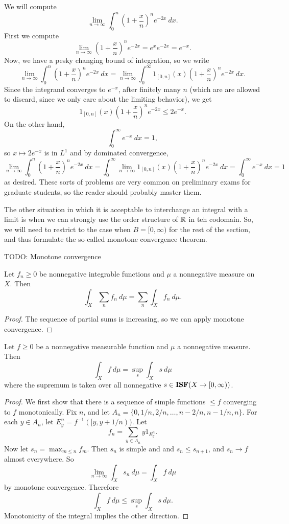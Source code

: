 \begin{example}
We will compute
$$\lim_{n \to \infty} \int_0^n \left(1 + \frac{x}{n}\right)^n e^{-2x} ~dx.$$
First we compute
$$\lim_{n \to \infty} \left(1 + \frac{x}{n}\right)^n e^{-2x} = e^x e^{-2x} = e^{-x}.$$
Now, we have a pesky changing bound of integration, so we write
$$\lim_{n \to \infty} \int_0^n \left(1 + \frac{x}{n}\right)^n e^{-2x} ~dx = \lim_{n \to \infty} \int_0^\infty 1_{[0, n]}(x) \left(1 + \frac{x}{n}\right)^n e^{-2x} ~dx.$$
Since the integrand converges to $e^{-x}$, after finitely many $n$ (which are are allowed to discard, since we only care about the limiting behavior), we get
$$1_{[0, n]}(x) \left(1 + \frac{x}{n}\right)^n e^{-2x} \leq 2e^{-x}.$$
On the other hand,
$$\int_0^\infty e^{-x} ~dx = 1,$$
so $x \mapsto 2e^{-x}$ is in $L^1$ and by dominated convergence,
$$\lim_{n \to \infty} \int_0^n \left(1 + \frac{x}{n}\right)^n e^{-2x} ~dx = \int_0^\infty \lim_{n \to \infty} 1_{[0, n]}(x) \left(1 + \frac{x}{n}\right)^n e^{-2x} ~dx = \int_0^\infty e^{-x} ~dx = 1$$
as desired.
These sorts of problems are very common on preliminary exams for graduate students, so the reader should probably master them.
\end{example}

\begin{subsec}
The other situation in which it is acceptable to interchange an integral with a limit is when we can strongly use the order structure of $\mathbb{R}$ in teh codomain.
So, we will need to restrict to the case when $B = [0, \infty)$ for the rest of the section, and thus formulate the so-called monotone convergence theorem.
\end{subsec}

TODO: Monotone convergence

\begin{corollary}
\label{positive summation}
Let $f_n \geq 0$ be nonnegative integrable functions and $\mu$ a nonnegative measure on $X$. Then
$$\int_X \sum_n f_n~d\mu = \sum_n \int_X f_n~d\mu.$$
\end{corollary}
\begin{proof}
The sequence of partial sums is increasing, so we can apply monotone convergence.
\end{proof}

\begin{corollary}
Let $f \geq 0$ be a nonnegative measurable function and $\mu$ a nonnegative measure. Then
$$\int_X f~d\mu = \sup_s \int_X s~d\mu$$
where the supremum is taken over all nonnegative $s \in \mathbf{ISF}(X \to [0, \infty))$.
\end{corollary}
\begin{proof}
We first show that there is a sequence of simple functions $\leq f$ converging to $f$ monotonically.
Fix $n$, and let $A_n = \{0, 1/n, 2/n, \dots, n - 2/n, n - 1/n, n\}$.
For each $y \in A_n$, let $E_y^n = f^{-1}([y, y + 1/n))$. Let
$$f_n = \sum_{y \in A_n} y1_{E_y^n}.$$
Now let $s_n = \max_{m \leq n} f_m$.
Then $s_n$ is simple and and $s_n \leq s_{n+1}$, and $s_n \to f$ almost everywhere.
So
$$\lim_{n \to \infty} \int_X s_n~d\mu = \int_X f~d\mu$$
by monotone convergence. Therefore
$$\int_X f~d\mu \leq \sup_s \int_X s~d\mu.$$
Monotonicity of the integral implies the other direction.
\end{proof}


